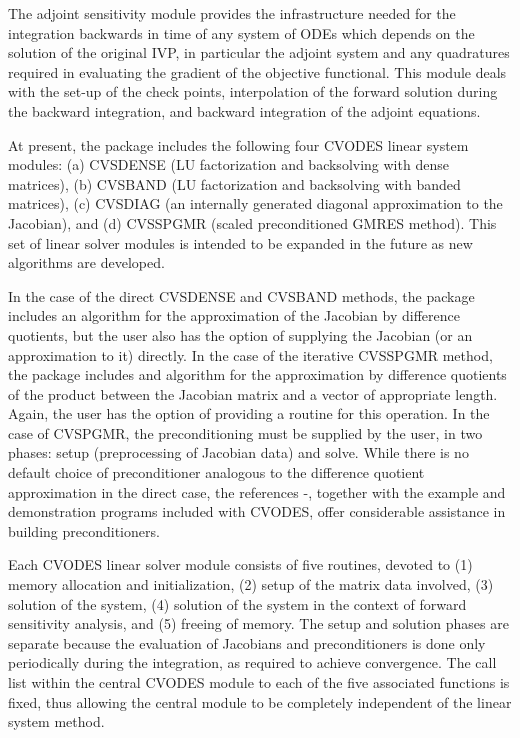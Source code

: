 The adjoint sensitivity module provides the infrastructure needed for the 
integration backwards in time of any system of ODEs which depends on the solution 
of the original IVP, in particular the adjoint system and any quadratures required
in evaluating the gradient of the objective functional.
This module deals with the set-up of the check points, interpolation of the forward 
solution during the backward integration, and backward integration of the adjoint
equations. 

At present, the package includes the following four CVODES linear system
modules:
(a) CVSDENSE (LU factorization and backsolving with dense matrices),
(b) CVSBAND (LU factorization and backsolving with banded matrices),
(c) CVSDIAG (an internally generated diagonal approximation to the 
Jacobian), and
(d) CVSSPGMR (scaled preconditioned GMRES method).
This set of linear solver modules is intended to be expanded in the
future as new algorithms are developed.

In the case of the direct CVSDENSE and CVSBAND methods, the package includes
an algorithm for the approximation of the Jacobian by difference
quotients, but the user also has the option of supplying the Jacobian
(or an approximation to it) directly. In the case of the iterative
CVSSPGMR method, the package includes and algorithm for the approximation
by difference quotients of the product between the Jacobian matrix and
a vector of appropriate length. Again, the user has the option of providing
a routine for this operation.
In the case of CVSPGMR, the preconditioning must be supplied by the user, 
in two phases: setup (preprocessing of Jacobian data) and solve.
While there is no default choice of preconditioner analogous to the 
difference quotient approximation in the direct case, the references
\cite{BrHi:89}-\cite{Byr:92}, together with
the example and demonstration programs included with CVODES, offer
considerable assistance in building preconditioners.

Each CVODES linear solver module consists of five routines, devoted to (1)
memory allocation and initialization, (2) setup of the matrix data
involved, (3) solution of the system, (4) solution of the system in the
context of forward sensitivity analysis, and (5) freeing of memory.  The
setup and solution phases are separate because the evaluation of
Jacobians and preconditioners is done only periodically during the
integration, as required to achieve convergence. The call list within
the central CVODES module to each of the five associated functions is
fixed, thus allowing the central module to be completely independent
of the linear system method.

